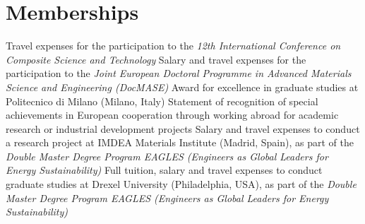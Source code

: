 \documentclass[
  a4paper, 
]{fortysecondscv}
\begin{document}
\section{Memberships}
\begin{cvtable}
\end{cvtable}

\newpage
\makethirdsidebar

\begin{cvtable}
		{{\small Travel expenses for the participation to the \emph{\small 12th International Conference on Composite Science and Technology}}}
		{{\small Salary and travel expenses for the participation to the \emph{\small Joint European Doctoral Programme in Advanced Materials Science and Engineering (DocMASE)}}}
		{{\small Award for excellence in graduate studies at Politecnico di Milano (Milano, Italy)}}
		{{\small Statement of recognition of special achievements in European cooperation through working abroad for academic research or industrial development projects}}
		{{\small Salary and travel expenses to conduct a research project at IMDEA Materials Institute (Madrid, Spain), as part of the \emph{\small Double Master Degree Program EAGLES (Engineers as Global Leaders for Energy Sustainability)}}}
		{{\small Full tuition, salary and travel expenses to conduct graduate studies at Drexel University (Philadelphia, USA), as part of the \emph{\small Double Master Degree Program EAGLES (Engineers as Global Leaders for Energy Sustainability)}}}

\end{cvtable}
\end{document}
